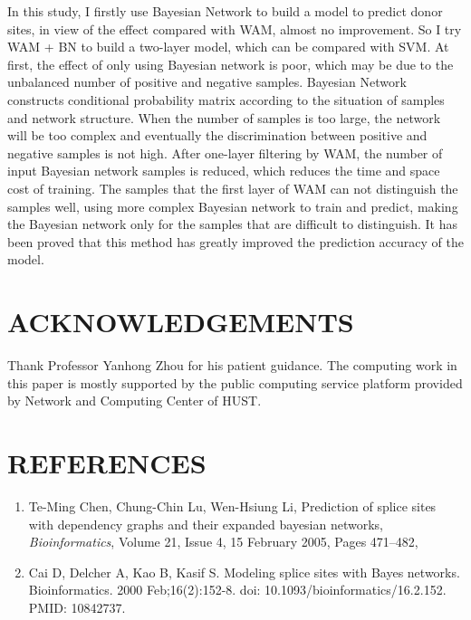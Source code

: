 \documentclass{gapd}
\begin{document}
In this study, I firstly use Bayesian Network to build a model to
predict donor sites, in view of the effect compared with WAM, almost no
improvement. So I try WAM + BN to build a two-layer model, which can be
compared with SVM. At first, the effect of only using Bayesian network
is poor, which may be due to the unbalanced number of positive and
negative samples. Bayesian Network constructs conditional probability
matrix according to the situation of samples and network structure. When
the number of samples is too large, the network will be too complex and
eventually the discrimination between positive and negative samples is
not high. After one-layer filtering by WAM, the number of input Bayesian
network samples is reduced, which reduces the time and space cost of
training. The samples that the first layer of WAM can not distinguish
the samples well, using more complex Bayesian network to train and
predict, making the Bayesian network only for the samples that are
difficult to distinguish. It has been proved that this method has
greatly improved the prediction accuracy of the model.



\section{ACKNOWLEDGEMENTS}\label{acknowledgements}

Thank Professor Yanhong Zhou for his patient guidance. The computing
work in this paper is mostly supported by the public computing service
platform provided by Network and Computing Center of HUST.

\section{REFERENCES}\label{references}

\begin{enumerate}
  \item
    Te-Ming Chen, Chung-Chin Lu, Wen-Hsiung Li, Prediction of splice sites
    with dependency graphs and their expanded bayesian networks,
    \emph{Bioinformatics}, Volume 21, Issue 4, 15 February 2005, Pages
    471--482, 
  \item
    Cai D, Delcher A, Kao B, Kasif S. Modeling splice sites with Bayes
    networks. Bioinformatics. 2000 Feb;16(2):152-8. doi:
    10.1093/bioinformatics/16.2.152. PMID: 10842737.
\end{enumerate}
\end{document}

